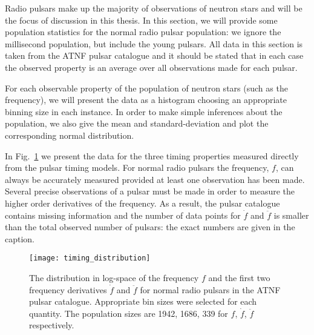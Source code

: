 Radio pulsars make up the majority of observations of neutron stars and will be
the focus of discussion in this thesis. In this section, we will provide some
population statistics for the normal radio pulsar population: we ignore the
millisecond population, but include the young pulsars. All data
in this section is taken from the ATNF pulsar catalogue \citet{ATNF} and it
should be stated that in each case the observed property is an average
over all observations made for each pulsar.

For each observable property of the population of neutron stars (such as the
frequency), we will present the data as a histogram choosing an appropriate
binning size in each instance. In order to make simple inferences about the
population, we also give the mean and standard-deviation and plot the
corresponding normal distribution.

In Fig.~\ref{fig: pop stats timing} we present the data for the three timing
properties measured directly from the pulsar timing models. For normal radio
pulsars the frequency, $f$, can always be accurately measured provided at least
one observation has been made.  Several precise observations of a pulsar must
be made in order to measure the higher order derivatives of the frequency. As a
result, the pulsar catalogue contains missing information and the number of
data points for $\dot{f}$ and $\ddot{f}$ is smaller than the total observed
number of pulsars: the exact numbers are given in the caption.
\begin{figure}[htb]
\centering
\texttt{[image: timing\_distribution]}
\caption{The distribution in log-space of the frequency $f$ and the first two
frequency derivatives $\dot{f}$ and $\ddot{f}$ for normal radio pulsars in the
ATNF pulsar catalogue. Appropriate bin sizes were selected for each quantity.
The population sizes are 1942, 1686, 339 for $f$,
$\dot{f}$, $\ddot{f}$ respectively.}
\label{fig: pop stats timing}
\end{figure}

